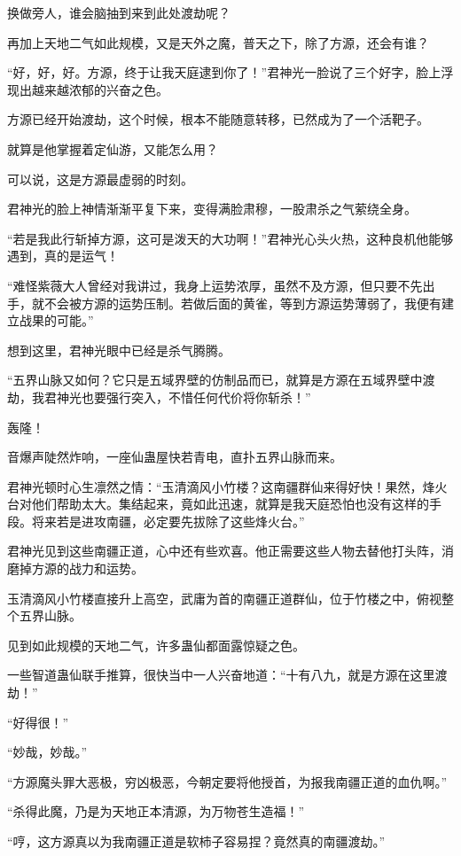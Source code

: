 \begin{this_body}
换做旁人，谁会脑抽到来到此处渡劫呢？

再加上天地二气如此规模，又是天外之魔，普天之下，除了方源，还会有谁？

“好，好，好。方源，终于让我天庭逮到你了！”君神光一脸说了三个好字，脸上浮现出越来越浓郁的兴奋之色。

方源已经开始渡劫，这个时候，根本不能随意转移，已然成为了一个活靶子。

就算是他掌握着定仙游，又能怎么用？

可以说，这是方源最虚弱的时刻。

君神光的脸上神情渐渐平复下来，变得满脸肃穆，一股肃杀之气萦绕全身。

“若是我此行斩掉方源，这可是泼天的大功啊！”君神光心头火热，这种良机他能够遇到，真的是运气！

“难怪紫薇大人曾经对我讲过，我身上运势浓厚，虽然不及方源，但只要不先出手，就不会被方源的运势压制。若做后面的黄雀，等到方源运势薄弱了，我便有建立战果的可能。”

想到这里，君神光眼中已经是杀气腾腾。

“五界山脉又如何？它只是五域界壁的仿制品而已，就算是方源在五域界壁中渡劫，我君神光也要强行突入，不惜任何代价将你斩杀！”

轰隆！

音爆声陡然炸响，一座仙蛊屋快若青电，直扑五界山脉而来。

君神光顿时心生凛然之情：“玉清滴风小竹楼？这南疆群仙来得好快！果然，烽火台对他们帮助太大。集结起来，竟如此迅速，就算是我天庭恐怕也没有这样的手段。将来若是进攻南疆，必定要先拔除了这些烽火台。”

君神光见到这些南疆正道，心中还有些欢喜。他正需要这些人物去替他打头阵，消磨掉方源的战力和运势。

玉清滴风小竹楼直接升上高空，武庸为首的南疆正道群仙，位于竹楼之中，俯视整个五界山脉。

见到如此规模的天地二气，许多蛊仙都面露惊疑之色。

一些智道蛊仙联手推算，很快当中一人兴奋地道：“十有八九，就是方源在这里渡劫！”

“好得很！”

“妙哉，妙哉。”

“方源魔头罪大恶极，穷凶极恶，今朝定要将他授首，为报我南疆正道的血仇啊。”

“杀得此魔，乃是为天地正本清源，为万物苍生造福！”

“哼，这方源真以为我南疆正道是软柿子容易捏？竟然真的南疆渡劫。”


\end{this_body}
